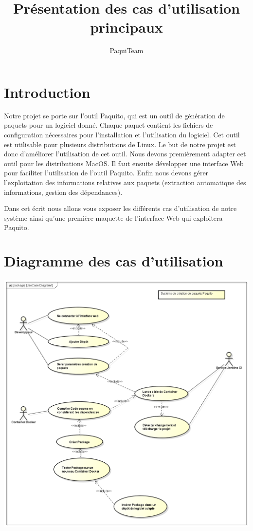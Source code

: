 \documentclass[12pt,a4paper]{article}
\title{Présentation des cas d'utilisation principaux}
\author{PaquiTeam}
\begin{document}


\section*{Introduction}
	Notre projet se porte sur l'outil Paquito, qui est un outil de génération de paquets pour un logiciel donné. Chaque paquet contient les fichiers de configuration nécessaires pour l'installation et l'utilisation du logiciel. Cet outil est utilisable pour plusieurs distributions de Linux. Le but de notre projet est donc d'améliorer l'utilisation de cet outil. Nous devons premièrement adapter cet outil pour les distributions MacOS. Il faut ensuite développer une interface Web pour faciliter l'utilisation de l'outil Paquito. Enfin nous devons gérer l'exploitation des informations relatives aux paquets (extraction automatique des informations, gestion des dépendances).
	
Dans cet écrit nous allons vous exposer les différents cas d'utilisation de notre système ainsi qu'une première maquette de l'interface Web qui exploitera Paquito.

\section{Diagramme des cas d'utilisation}

	\includegraphics[scale=0.4]{../img/usecasePaquito.png}
\end{document}
